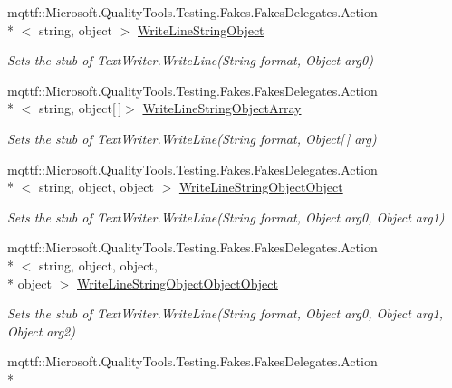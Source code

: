 \begin{DoxyCompactItemize}
mqttf\-::\-Microsoft.\-Quality\-Tools.\-Testing.\-Fakes.\-Fakes\-Delegates.\-Action\\*
$<$ string, object $>$ \hyperlink{class_system_1_1_i_o_1_1_fakes_1_1_stub_stream_writer_aac2ac37aecb87ee398a0ed3ced1592e2}{Write\-Line\-String\-Object}
\begin{DoxyCompactList}\small\item\em Sets the stub of Text\-Writer.\-Write\-Line(\-String format, Object arg0)\end{DoxyCompactList}\item 
mqttf\-::\-Microsoft.\-Quality\-Tools.\-Testing.\-Fakes.\-Fakes\-Delegates.\-Action\\*
$<$ string, object\mbox{[}$\,$\mbox{]}$>$ \hyperlink{class_system_1_1_i_o_1_1_fakes_1_1_stub_stream_writer_a93994fe5e16c0bf75e8b6108fe64179f}{Write\-Line\-String\-Object\-Array}
\begin{DoxyCompactList}\small\item\em Sets the stub of Text\-Writer.\-Write\-Line(\-String format, Object\mbox{[}$\,$\mbox{]} arg)\end{DoxyCompactList}\item 
mqttf\-::\-Microsoft.\-Quality\-Tools.\-Testing.\-Fakes.\-Fakes\-Delegates.\-Action\\*
$<$ string, object, object $>$ \hyperlink{class_system_1_1_i_o_1_1_fakes_1_1_stub_stream_writer_ad2a2ff90585b7b06f4217090017237b8}{Write\-Line\-String\-Object\-Object}
\begin{DoxyCompactList}\small\item\em Sets the stub of Text\-Writer.\-Write\-Line(\-String format, Object arg0, Object arg1)\end{DoxyCompactList}\item 
mqttf\-::\-Microsoft.\-Quality\-Tools.\-Testing.\-Fakes.\-Fakes\-Delegates.\-Action\\*
$<$ string, object, object, \\*
object $>$ \hyperlink{class_system_1_1_i_o_1_1_fakes_1_1_stub_stream_writer_a29613edec7c7969a6bf276f79f81c901}{Write\-Line\-String\-Object\-Object\-Object}
\begin{DoxyCompactList}\small\item\em Sets the stub of Text\-Writer.\-Write\-Line(\-String format, Object arg0, Object arg1, Object arg2)\end{DoxyCompactList}\item 
mqttf\-::\-Microsoft.\-Quality\-Tools.\-Testing.\-Fakes.\-Fakes\-Delegates.\-Action\\*

\end{DoxyCompactItemize}

